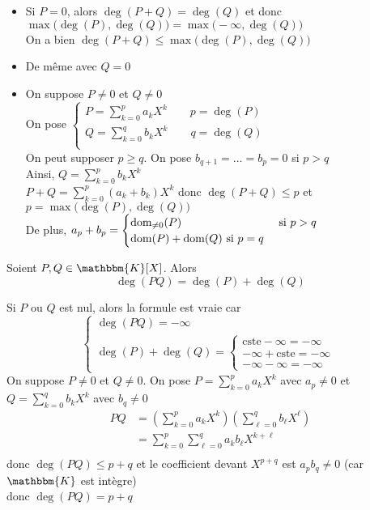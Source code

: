 \begin{prv}
	\begin{itemize}
		\item Si $P = 0$, alors $\deg(P+Q) = \deg(Q)$ et donc $\max\big(\deg(P), \deg(Q)\big) = \max\big(-\infty, \deg(Q)\big)$\\
			On a bien $\deg(P+Q) \le \max\big(\deg(P), \deg(Q)\big)$
		\item De même avec $Q = 0$
		\item On suppose $P \neq 0$ et $Q \neq 0$ \\
			On pose $\begin{cases}
				P = \sum_{k=0}^p a_k X^k \qquad p = \deg(P)\\
				Q = \sum_{k=0}^q b_k X^k \qquad q = \deg(Q)\\
			\end{cases}$ \\
			On peut supposer $p\ge q$. On pose $b_{q+1} = \ldots = b_p = 0$ si $p > q$ \\
			Ainsi, $Q = \sum_{k=0}^p b_kX^k$\\
			$P+Q = \sum_{k=0}^p (a_k + b_k) X^k$ donc $\deg(P+Q) \le p$ et $p = \max\big(\deg(P), \deg(Q)\big)$\\
			De plus, $a_p + b_p = \begin{cases}
				\operatorname*{dom}_{\neq 0}(P) &\text{ si } p > q\\
				\operatorname*{dom}(P) + \operatorname*{dom}(Q) \text{ si } p = q
			\end{cases}$
	\end{itemize}
\end{prv}

\begin{prop}
	Soient $P, Q \in \mathbbm{K}[X]$. Alors \[
		\deg(PQ) = \deg(P) + \deg(Q)
	\] 
\end{prop}

\begin{prv}
	Si $P$ ou $Q$ est nul, alors la formule est vraie car \[
		\begin{cases}
			\deg(PQ) = -\infty\\
			\deg(P) + \deg(Q) = \begin{cases}
				\mathrm{cste} - \infty = -\infty\\
				-\infty + \mathrm{cste} = -\infty\\
				-\infty - \infty = -\infty
			\end{cases}
		\end{cases}
	\] On suppose $P \neq 0$ et $Q \neq 0$. On pose $P = \sum_{k=0}^p a_k X^k$ avec $a_p \neq 0$ et $Q = \sum_{k=0}^q b_k X^k$ avec $b_q \neq 0$
	\begin{align*}
		PQ &= \left( \sum_{k=0}^p a_k X^k \right) \left( \sum_{\ell=0}^q b_\ell X^\ell \right) \\
		&= \sum_{k=0}^p \sum_{\ell=0}^q a_k b_{\ell} X^{k+\ell} \\
	\end{align*}
	donc $\deg(PQ) \le p+q$ et le coefficient devant $X^{p+q}$ est $a_p b_q \neq 0$ (car $\mathbbm{K}$ est intègre)\\
	donc $\deg(PQ) = p+q$
\end{prv}
